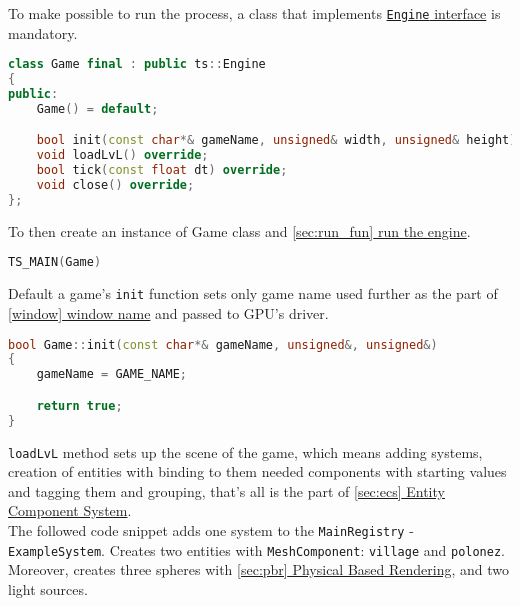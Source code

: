 To make possible to run the process, a class that implements \hyperref[sec:engine_class]{\texttt{Engine} interface} is mandatory. 
\begin{lstlisting}[language=c++, caption=An example of a game class header (./game/game.h)]
class Game final : public ts::Engine
{
public:
    Game() = default;

    bool init(const char*& gameName, unsigned& width, unsigned& height) override;
    void loadLvL() override;
    bool tick(const float dt) override;
    void close() override;
};
\end{lstlisting}
To then create an instance of Game class and \hyperref[sec:run_fun]{\ref*{sec:run_fun} run the engine}.
\begin{lstlisting}[language=c++, caption=A game instance (./game/game.cpp)]
TS_MAIN(Game)
\end{lstlisting}
Default a game's \texttt{init} function sets only game name used further as the part of \hyperref[window]{\ref*{window} window name} and passed to GPU's driver.
\begin{lstlisting}[language=c++, caption=An example of a game \texttt{init} function (./game/game.cpp)]
bool Game::init(const char*& gameName, unsigned&, unsigned&)
{
    gameName = GAME_NAME;

    return true;
}
\end{lstlisting}
\texttt{loadLvL} method sets up the scene of the game, which means adding systems, creation of entities with binding to them needed components with starting values and tagging them and grouping, that's all is the part of \hyperref[sec:ecs]{\ref*{sec:ecs} Entity Component System}.\\ The followed code snippet adds one system to the \texttt{MainRegistry} - \texttt{ExampleSystem}. Creates two  entities with \texttt{MeshComponent}: \texttt{village} and \texttt{polonez}. Moreover, creates three spheres with \hyperref[sec:pbr]{\ref*{sec:pbr} Physical Based Rendering}, and two light sources.
